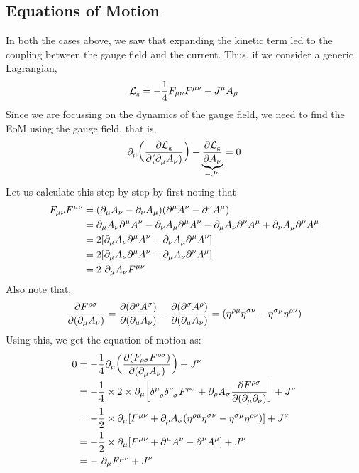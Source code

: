 \subsection{Equations of Motion}
In both the cases above, we saw that expanding the kinetic term led to the coupling between the gauge field and the current. Thus, if we consider a generic Lagrangian,
$$\mathcal L_{\text{\tiny g}} = -\frac{1}{4}F_{\mu\nu}F^{\mu\nu} -J^\mu A_\mu$$
Since we are focussing on the dynamics of the gauge field, we need to find the EoM using the gauge field, that is,
$$\partial_\mu\qty(\pdv{\mathcal L_{\text{\tiny g}}}{(\partial_\mu A_\nu)}) - \underbrace{\pdv{\mathcal L_{\text{\tiny g}}}{A_{\nu}}}_{-J^\nu}=0$$
Let us calculate this step-by-step by first noting that
\begin{align}\label{eqn:fmfn}
    \begin{split}
        F_{\mu\nu}F^{\mu\nu}&= (\partial_\mu A_\nu - \partial_\nu A_\mu)(\partial^\mu A^\nu - \partial^\nu A^\mu)\\
    &=\partial_\mu A_\nu\partial^\mu A^\nu -\partial_\nu A_\mu\partial^\mu A^\nu -\partial_\mu A_\nu \partial^\nu A^\mu + \partial_\nu A_\mu \partial^\nu A^\mu\\
    &=2\qty[\partial_\mu A_\nu\partial^\mu A^\nu  - \partial_\nu A_\mu\partial^\mu A^\nu]\\
    &=2\qty[\partial_\mu A_\nu\partial^\mu A^\nu  - \partial_\mu A_\nu\partial^\nu A^\mu]\\
    &=2\ \partial_\mu A_\nu F^{\mu\nu}
    \end{split}
\end{align}
Also note that,
$$\pdv{F^{\rho\sigma}}{(\partial_\mu A_\nu)} = \pdv{(\partial^\rho A^\sigma)}{(\partial_\mu A_\nu)} - \pdv{(\partial^\sigma A^\rho)}{(\partial_\mu A_\nu)} = (\tensor{\eta}{^{\rho} ^\mu}\tensor{\eta}{^{\sigma} ^\nu}-\tensor{\eta}{^\sigma ^\mu}\tensor{\eta}{^{\rho} ^\nu})$$
Using this, we get the equation of motion as:
\begin{align*}
    0 &=-\frac{1}{4} \partial_\mu\qty(\pdv{(F_{\rho\sigma}F^{\rho\sigma})}{(\partial_\mu A_\nu)}) + J^\nu\\
    &=-\frac{1}{4}\times 2\times\partial_\mu\qty[\tensor{\delta}{^\mu _{\rho} }\tensor{\delta}{ ^\nu _{\sigma} } F^{\rho\sigma} + \partial_\rho A_\sigma \pdv{F^{\rho\sigma}}{(\partial_\mu\partial_\nu)}] + J^\nu\\
    &=-\frac{1}{2}\times\partial_\mu\qty[F^{\mu \nu} +  \partial_\rho A_\sigma \qty(\tensor{\eta}{^{\rho} ^\mu}\tensor{\eta}{^{\sigma} ^\nu}-\tensor{\eta}{^\sigma ^\mu}\tensor{\eta}{^{\rho} ^\nu})]+J^\nu\\
    &=-\frac{1}{2}\times\partial_\mu \qty[F^{\mu \nu} + \partial^\mu A^\nu  - \partial^\nu A^\mu] + J^\nu\\
    &=-\ \partial_\mu F^{\mu\nu} + J^\nu
\end{align*}
